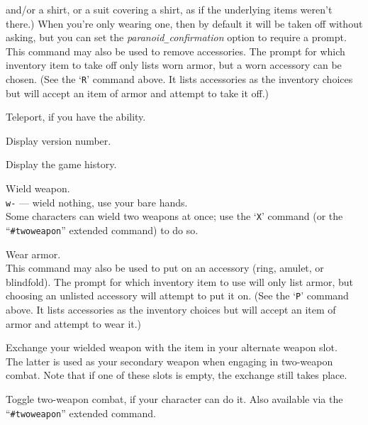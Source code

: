 and/or a shirt, or a suit covering a shirt, as if the underlying items
weren't there.)
When you're only wearing one, then by default it will
be taken off without asking, but you can set the
{\it paranoid\verb+_+confirmation\/}
option to require a prompt.\\
This command may also be used to remove accessories.  The prompt
for which inventory item to take off only lists worn armor, but a worn
accessory can be chosen.
(See the `{\tt R}' command above.  It lists accessories as the inventory
choices but will accept an item of armor and attempt to take it off.)
\item[\tb{\^{}T}]
Teleport, if you have the ability.
\item[\tb{v}]
Display version number.
\item[\tb{V}]
Display the game history.
\item[\tb{w}]
Wield weapon.\\
{\tt w-} --- wield nothing, use your bare hands.\\
Some characters can wield two weapons at once; use the `{\tt X}' command
(or the ``{\tt \#twoweapon}'' extended command) to do so.
\item[\tb{W}]
Wear armor.\\
This command may also be used to put on an accessory (ring, amulet, or
blindfold).  The prompt for which inventory item to use will only list
armor, but choosing an unlisted accessory will attempt to put it on.
(See the `{\tt P}' command above.  It lists accessories as the inventory
choices but will accept an item of armor and attempt to wear it.)
\item[\tb{x}]
Exchange your wielded weapon with the item in your alternate weapon slot.\\
The latter is used as your secondary weapon when engaging in
two-weapon combat.  Note that if one of these slots is empty,
the exchange still takes place.
\item[\tb{X}]
Toggle two-weapon combat, if your character can do it.  Also available
via the ``{\tt \#twoweapon}'' extended command.\\

